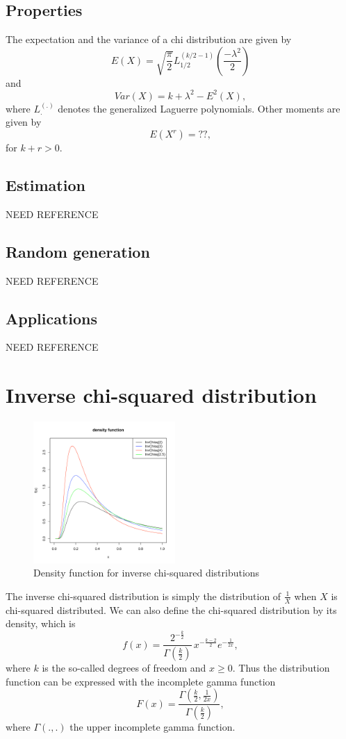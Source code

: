 \subsection{Properties}
The expectation and the variance of a chi distribution are given by $$
E(X) =\sqrt{\frac{\pi}{2}}L_{1/2}^{(k/2-1)}\left(\frac{-\lambda^2}{2}\right)
$$ and $$
Var(X) = k+\lambda^2-E^2(X), $$
where $L_.^{(.)}$ denotes the generalized Laguerre polynomials.
Other moments are given by
$$
E(X^r) = ??,
$$
for $k+r>0$.

\subsection{Estimation}
NEED REFERENCE

\subsection{Random generation}
NEED REFERENCE

\subsection{Applications}
NEED REFERENCE

\section{Inverse chi-squared distribution}
\begin{figure}
  \vspace{-20pt}
  \begin{center}
    \includegraphics[width=0.48\textwidth]{img/invchisqzoom}
  \end{center}
  \vspace{-20pt}  
  \caption{Density function for inverse chi-squared distributions}
\end{figure}
The inverse chi-squared distribution is simply the distribution of $\frac{1}{X}$ when $X$ is chi-squared distributed.
We can also define the chi-squared distribution by its density, which is
$$
f(x) = \frac{2^{-\frac{k}{2}}}{\Gamma(\frac{k}{2})}\,x^{-\frac{k-2}{2}}  e^{-\frac{1}{2x}},
$$
where $k$ is the so-called degrees of freedom and $x\geq 0$. Thus the distribution function can be expressed with the incomplete gamma function
$$
F(x) = \frac{\Gamma(\frac{k}{2},\frac{1}{2x})}{\Gamma(\frac{k}{2})},
$$
where $\Gamma(.,.)$ the upper incomplete gamma function.

